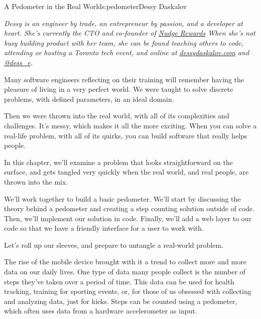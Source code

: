 \begin{aosachapter}{A Pedometer in the Real World}{s:pedometer}{Dessy Daskalov}

\emph{Dessy is an engineer by trade, an entrepreneur by passion, and a
developer at heart. She's currently the CTO and co-founder of
\href{http://nudgerewards.com/.}{Nudge Rewards} When she's not busy
building product with her team, she can be found teaching others to
code, attending or hosting a Toronto tech event, and online at
\href{http://www.dessydaskalov.com/}{dessydaskalov.com} and
\href{https://twitter.com/dess_e}{@dess\_e}.}

\label{a-perfect-world}

Many software engineers reflecting on their training will remember
having the pleasure of living in a very perfect world. We were taught to
solve discrete problems, with defined parameters, in an ideal domain.

Then we were thrown into the real world, with all of its complexities
and challenges. It's messy, which makes it all the more exciting. When
you can solve a real-life problem, with all of its quirks, you can build
software that really helps people.

In this chapter, we'll examine a problem that looks straightforward on
the surface, and gets tangled very quickly when the real world, and real
people, are thrown into the mix.

We'll work together to build a basic pedometer. We'll start by
discussing the theory behind a pedometer and creating a step counting
solution outside of code. Then, we'll implement our solution in code.
Finally, we'll add a web layer to our code so that we have a friendly
interface for a user to work with.

Let's roll up our sleeves, and prepare to untangle a real-world problem.

\label{pedometer-theory}

The rise of the mobile device brought with it a trend to collect more
and more data on our daily lives. One type of data many people collect
is the number of steps they've taken over a period of time. This data
can be used for health tracking, training for sporting events, or, for
those of us obsessed with collecting and analyzing data, just for kicks.
Steps can be counted using a pedometer, which often uses data from a
hardware accelerometer as input.

\label{whats-an-accelerometer}


\end{aosachapter}

